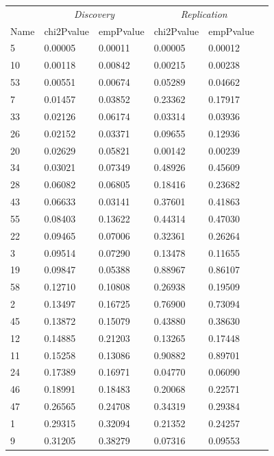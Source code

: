 \begin{table}[ht]
\centering
\setlength{\extrarowheight}{2pt}
\begin{tabular}{llllll}
  \toprule
   &  \multicolumn{2}{c}{\textit{Discovery}} & \multicolumn{2}{c}{\textit{Replication}} \\
   \cmidrule{2-5}
 Name & chi2Pvalue  & empPvalue  & chi2Pvalue   & empPvalue   \\ 
  \midrule
5 & 0.00005 & 0.00011 & 0.00005 & 0.00012 \\ 
  10 & 0.00118 & 0.00842 & 0.00215 & 0.00238 \\ 
  53 & 0.00551 & 0.00674 & 0.05289 & 0.04662 \\ 
  7 & 0.01457 & 0.03852 & 0.23362 & 0.17917 \\ 
  33 & 0.02126 & 0.06174 & 0.03314 & 0.03936 \\ 
  26 & 0.02152 & 0.03371 & 0.09655 & 0.12936 \\ 
  20 & 0.02629 & 0.05821 & 0.00142 & 0.00239 \\ 
  34 & 0.03021 & 0.07349 & 0.48926 & 0.45609 \\ 
  28 & 0.06082 & 0.06805 & 0.18416 & 0.23682 \\ 
  43 & 0.06633 & 0.03141 & 0.37601 & 0.41863 \\ 
  55 & 0.08403 & 0.13622 & 0.44314 & 0.47030 \\ 
  22 & 0.09465 & 0.07006 & 0.32361 & 0.26264 \\ 
  3 & 0.09514 & 0.07290 & 0.13478 & 0.11655 \\ 
  19 & 0.09847 & 0.05388 & 0.88967 & 0.86107 \\ 
  58 & 0.12710 & 0.10808 & 0.26938 & 0.19509 \\ 
  2 & 0.13497 & 0.16725 & 0.76900 & 0.73094 \\ 
  45 & 0.13872 & 0.15079 & 0.43880 & 0.38630 \\ 
  12 & 0.14885 & 0.21203 & 0.13265 & 0.17448 \\ 
  11 & 0.15258 & 0.13086 & 0.90882 & 0.89701 \\ 
  24 & 0.17389 & 0.16971 & 0.04770 & 0.06090 \\ 
  46 & 0.18991 & 0.18483 & 0.20068 & 0.22571 \\ 
  47 & 0.26565 & 0.24708 & 0.34319 & 0.29384 \\ 
  1 & 0.29315 & 0.32094 & 0.21352 & 0.24257 \\ 
  9 & 0.31205 & 0.38279 & 0.07316 & 0.09553 \\ 

\end{tabular}
\end{table}
